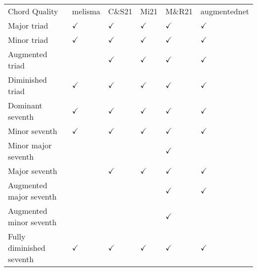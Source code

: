 \begin{tabular}{llllll}
Chord Quality             & \gls{melisma} & C\&S21 & Mi21 & M\&R21 & \gls{augmentednet} \\
Major triad               & $\checkmark$      & $\checkmark$                        & $\checkmark$                        & $\checkmark$                           & $\checkmark$                 \\
Minor triad               & $\checkmark$      & $\checkmark$                        & $\checkmark$                        & $\checkmark$                           & $\checkmark$                 \\
Augmented triad           &         & $\checkmark$                        & $\checkmark$                        & $\checkmark$                           & $\checkmark$                 \\
Diminished triad          & $\checkmark$      & $\checkmark$                        & $\checkmark$                        & $\checkmark$                           & $\checkmark$                 \\
Dominant seventh          & $\checkmark$      & $\checkmark$                        & $\checkmark$                        & $\checkmark$                           & $\checkmark$                 \\
Minor seventh             & $\checkmark$      & $\checkmark$                        & $\checkmark$                        & $\checkmark$                           & $\checkmark$                 \\
Minor major seventh       &         &                           &                           & $\checkmark$                           &                    \\
Major seventh             &         & $\checkmark$                        & $\checkmark$                        & $\checkmark$                           & $\checkmark$                 \\
Augmented major seventh   &         &                           &                           & $\checkmark$                           & $\checkmark$                 \\
Augmented minor seventh   &         &                           &                           & $\checkmark$                           &                    \\
Fully diminished seventh  & $\checkmark$      & $\checkmark$                        & $\checkmark$                        & $\checkmark$                           & $\checkmark$                 \\

\end{tabular}
